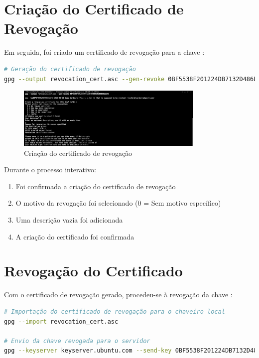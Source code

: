 \section{Criação do Certificado de Revogação}
Em seguida, foi criado um certificado de revogação para a chave \cite{rfc4880}:

\begin{lstlisting}[language=bash]
# Geração do certificado de revogação
gpg --output revocation_cert.asc --gen-revoke 0BF5538F201224DB7132D486DD9A93D9B6812243
\end{lstlisting}

\begin{figure}[htb]
    \centering
    \includegraphics[width=0.8\textwidth]{images/02-criacao_certificado_revogacao.jpg}
    \caption{Criação do certificado de revogação}
    \label{fig:criacao-certificado-revogacao}
\end{figure}

Durante o processo interativo:
\begin{enumerate}
    \item Foi confirmada a criação do certificado de revogação
    \item O motivo da revogação foi selecionado (0 = Sem motivo específico)
    \item Uma descrição vazia foi adicionada
    \item A criação do certificado foi confirmada
\end{enumerate}

\section{Revogação do Certificado}
Com o certificado de revogação gerado, procedeu-se à revogação da chave \cite{rfc4880}:

\begin{lstlisting}[language=bash]
# Importação do certificado de revogação para o chaveiro local
gpg --import revocation_cert.asc

# Envio da chave revogada para o servidor
gpg --keyserver keyserver.ubuntu.com --send-key 0BF5538F201224DB7132D486DD9A93D9B6812243
\end{lstlisting}

